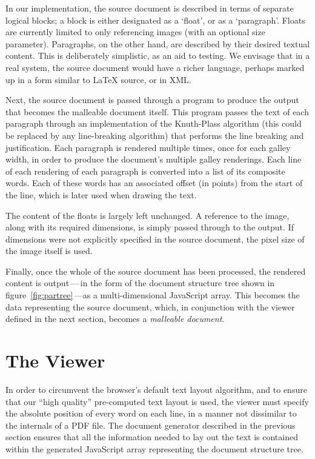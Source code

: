 In our implementation, the source document is described in terms of separate logical blocks; a block is either designated as a `float', or as a `paragraph'. Floats are currently limited to only referencing images (with an optional size parameter). Paragraphs, on the other hand, are described by their desired textual content. This is deliberately simplistic, as an aid to testing. We envisage that in a real system, the source document would have a richer language, perhaps marked up in a form similar to \LaTeX{} source, or in XML.

Next, the source document is passed through a program to produce the output that becomes the malleable document itself. This program passes the text of each paragraph through an implementation of the Knuth-Plass algorithm (this could be replaced by any line-breaking algorithm) that performs the line breaking and justification. Each paragraph is rendered multiple times, once for each galley width, in order to produce the document's multiple galley renderings. Each line of each rendering of each paragraph is converted into a list of its composite words. Each of these words has an associated offset (in points) from the start of the line, which is later used when drawing the text.

The content of the floats is largely left unchanged. A reference to the image, along with its required dimensions, is simply passed through to the output. If dimensions were not explicitly specified in the source document, the pixel size of the image itself is used.

Finally, once the whole of the source document has been processed, the rendered content is output\,---\,in the form of the document structure tree shown in figure~\ref{fig:partree}\,---as a multi-dimensional JavaScript array. This becomes the data representing the source document, which, in conjunction with the viewer defined in the next section, becomes a \emph{malleable document}.




\section{The Viewer}
\label{sec:viewer}

In order to circumvent the browser's default text layout algorithm, and to ensure that our ``high quality'' pre-computed text layout is used, the viewer must specify the absolute position of every word on each line, in a manner not dissimilar to the internals of a PDF file. The document generator described in the previous section ensures that all the information needed to lay out the text is contained within the generated JavaScript array representing the document structure tree.

